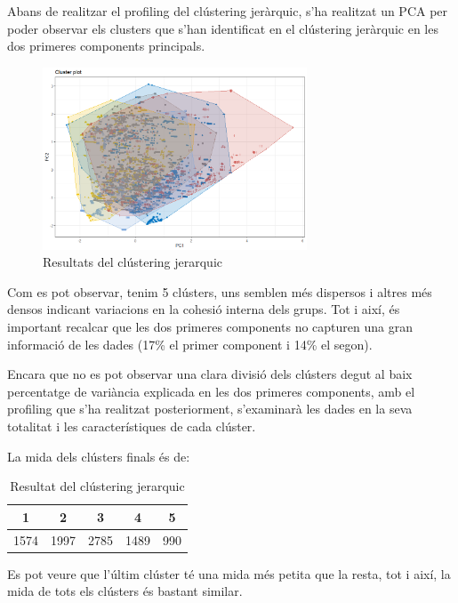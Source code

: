 \documentclass{article}
\begin{document}
Abans de realitzar el profiling del clústering jeràrquic, s'ha realitzat un PCA per poder observar els clusters que s'han identificat en el clústering jeràrquic en les dos primeres components principals.

\begin{figure}[H]
    \centering
    \includegraphics[width=0.7\textwidth]{Images/4_clustering/herarchical/pca_hierarchical.png}
    \caption{Resultats del clústering jerarquic}
    \label{fig:pca_hierarchical}
\end{figure}

Com es pot observar, tenim 5 clústers, uns semblen més dispersos i altres més densos indicant variacions en la cohesió interna dels grups. Tot i així, és important recalcar que les dos primeres components no capturen una gran informació de les dades (17\% el primer component i 14\% el segon).

Encara que no es pot observar una clara divisió dels clústers degut al baix percentatge de variància explicada en les dos primeres components, amb  el profiling que s'ha realitzat posteriorment, s'examinarà les dades en la seva totalitat i les característiques de cada clúster.   

La mida dels clústers finals és de:
\begin{table}[H]
\centering
\begin{tabular}{|c|c|c|c|c|}
\hline
1    & 2    & 3   & 4   & 5 \\ \hline
1574 & 1997 & 2785 & 1489  & 990  \\ \hline
\end{tabular}
\caption{Resultat del clústering jerarquic}
\label{tab:clustering_results}
\end{table}

Es pot veure que l'últim clúster té una mida més petita que la resta, tot i així, la mida de tots els clústers és bastant similar.
\end{document}
